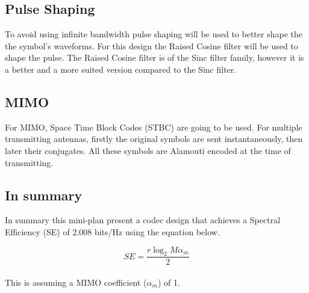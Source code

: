 \documentclass[]{article}
\begin{document}
\subsection*{Pulse Shaping}
To avoid using infinite bandwidth pulse shaping will be used to better shape the the symbol's waveforms. For this design the Raised Cosine filter will be used to shape the pulse. The Raised Cosine filter is of the Sinc filter family, however it is a better and a more suited version compared to the Sinc filter.

\subsection*{MIMO}
For MIMO, Space Time Block Codes (STBC) are going to be used. For multiple transmitting antennas, firstly the original symbols are sent instantaneously, then later their conjugates. All these symbols are Alamouti encoded at the time of transmitting.

\subsection*{In summary}
In summary this mini-plan present a codec design that achieves a Spectral Efficiency (SE) of 2.008  bits/Hz using the equation below.

\begin{equation}
SE = \frac{r\log_{2}M\alpha_{m}}{2}
\end{equation}{} 
\\
This is assuming a MIMO coefficient ($\alpha_{m}$) of 1.
\end{document}
